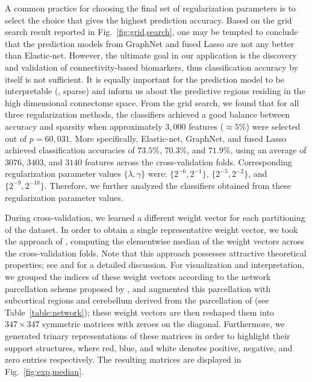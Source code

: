 A common practice for choosing the final set of regularization parameters is to select the choice that gives the highest prediction accuracy.
Based on the grid search result reported in Fig.~\ref{fig:grid,search}, one may be tempted to conclude that the prediction models from GraphNet and fused Lasso are not any better than Elastic-net.
However, the ultimate goal in our application is the discovery and validation of connectivity-based biomarkers, thus classification accuracy by itself is not sufficient.
It is equally important for the prediction model to be interpretable  (\eg, sparse) and inform us about the predictive regions residing in the high dimensional connectome space.
From the grid search, we found that for all three regularization methods, the classifiers achieved a good balance between accuracy and sparsity when approximately $3,000$ features ($\approx 5\%$) were selected out of $p=60,031$.
More specifically, Elastic-net, GraphNet, and fused Lasso achieved classification accuracies of $73.5\%$, $70.3\%$, and $71.9\%$, using an average of $3076$, $3403$, and $3140$ features across the cross-validation folds.
Corresponding regularization parameter values $\{\lambda,\gamma\}$ were: $\{2^{-6},2^{-1}\}$, $\{2^{-5},2^{-2}\}$, and $\{2^{-9},2^{-10}\}$.
Therefore, we further analyzed the classifiers obtained from these regularization parameter values. 

During cross-validation, we learned a different weight vector for each partitioning of the dataset.
In order to obtain a single representative weight vector, we took the approach of \cite{Grosenick:2013}, computing the elementwise median of the weight vectors across the cross-validation folds.
Note that this approach possesses attractive theoretical properties; see \cite{Grosenick:2013} and \cite{Minsker:2013} for a detailed discussion.
For visualization and interpretation, we grouped the indices of these weight vectors according to the network parcellation scheme proposed by \cite{Yeo:2011}, and augmented this parcellation with subcortical regions and cerebellum derived from the parcellation of \cite{AAL:2002} (see Table~\ref{table:network}); these weight vectors are then reshaped them into $347\times 347$ symmetric matrices with zeroes on the diagonal.
Furthermore, we generated trinary representations of these matrices in order to highlight their support structures, where red, blue, and white denotes positive, negative, and zero entries respectively.
The resulting matrices are displayed in Fig.~\ref{fig:exp,median}.

